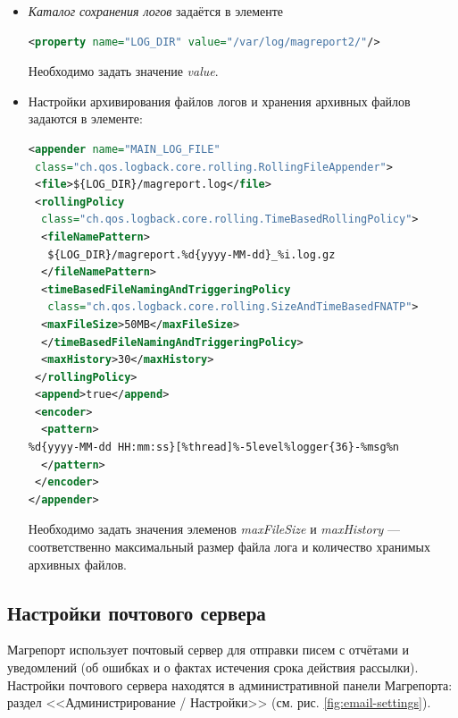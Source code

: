 \documentclass[../user-manual.tex]{subfiles}
\begin{document}
	\begin{itemize}
		\item \textit{Каталог сохранения логов} задаётся в элементе
		
		\begin{lstlisting}[language=XML]
<property name="LOG_DIR" value="/var/log/magreport2/"/>
		\end{lstlisting}
		
		Необходимо задать значение \textit{value}.
		
		\item Настройки архивирования файлов логов и хранения архивных файлов задаются в элементе:
		
		\begin{lstlisting}[language=XML]
<appender name="MAIN_LOG_FILE" 
 class="ch.qos.logback.core.rolling.RollingFileAppender">
 <file>${LOG_DIR}/magreport.log</file>
 <rollingPolicy 
  class="ch.qos.logback.core.rolling.TimeBasedRollingPolicy">
  <fileNamePattern>
   ${LOG_DIR}/magreport.%d{yyyy-MM-dd}_%i.log.gz
  </fileNamePattern>
  <timeBasedFileNamingAndTriggeringPolicy 
   class="ch.qos.logback.core.rolling.SizeAndTimeBasedFNATP">
  <maxFileSize>50MB</maxFileSize>
  </timeBasedFileNamingAndTriggeringPolicy>
  <maxHistory>30</maxHistory>
 </rollingPolicy>
 <append>true</append>
 <encoder>
  <pattern>
%d{yyyy-MM-dd HH:mm:ss}[%thread]%-5level%logger{36}-%msg%n
  </pattern>
 </encoder>
</appender>
		\end{lstlisting}
	
	Необходимо задать значения элеменов \textit{maxFileSize} и \textit{maxHistory} --- соответственно максимальный размер файла лога и количество хранимых архивных файлов.
	
	\end{itemize}
	
	\subsection{Настройки почтового сервера}
	
	Магрепорт использует почтовый сервер для отправки писем с отчётами и уведомлений (об ошибках и о фактах истечения срока действия рассылки). Настройки почтового сервера находятся в административной панели Магрепорта: раздел <<Администрирование / Настройки>> (см. рис. \ref{fig:email-settings}).
	
\end{document}
